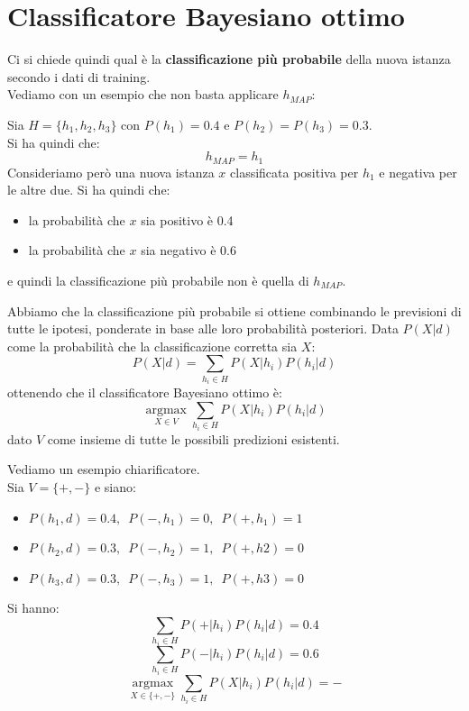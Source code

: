 \section{Classificatore Bayesiano ottimo}
Ci si chiede quindi qual è la \textbf{classificazione più probabile} della nuova istanza
secondo i dati di training.\\
Vediamo con un esempio che non basta applicare $h_{MAP}$:
\begin{esempio}
  Sia $H=\{h_1, h_2, h_3\}$ con $P(h_1)=0.4$ e $P(h_2)=P(h_3)=0.3$.\\
  Si ha quindi che:
  \[h_{MAP}=h_1\]
  Consideriamo però una nuova istanza $x$ classificata positiva per $h_1$ e
  negativa per le altre due. Si ha quindi che:
  \begin{itemize}
    \item la probabilità che $x$ sia positivo è 0.4
    \item la probabilità che $x$ sia negativo è 0.6
  \end{itemize}
  e quindi la classificazione più probabile non è quella di $h_{MAP}$.
\end{esempio}
Abbiamo che la classificazione più probabile si ottiene combinando le previsioni
di tutte le ipotesi, ponderate in base alle loro probabilità posteriori. Data
$P(X|d)$ come la probabilità che la classificazione corretta sia $X$:
\[P(X|d)=\sum_{h_i\in H}P(X|h_i)P(h_i|d)\]
ottenendo che il classificatore Bayesiano ottimo è:
\[\operatorname*{argmax}_{X\in V}\sum_{h_i\in H}P(X|h_i)P(h_i|d)\]
dato $V$ come insieme di tutte le possibili predizioni esistenti.
\begin{esempio}
  Vediamo un esempio chiarificatore.\\
  Sia $V=\{+,-\}$ e siano:
  \begin{itemize}
    \item $P(h_1, d) =0.4,\,\,\, P(-, h_1) = 0,\,\,\, P(+, h_1) = 1$
    \item $P(h_2, d) =0.3,\,\,\, P(-, h_2) = 1,\,\,\, P(+, h2) = 0$
    \item $P(h_3, d) =0.3,\,\,\, P(-, h_3) = 1,\,\,\, P(+, h3) = 0$
  \end{itemize}
  Si hanno:
  \[\sum_{h_i\in H}P(+|h_i)P(h_i|d)=0.4\]
  \[\sum_{h_i\in H}P(-|h_i)P(h_i|d)=0.6\]
  \[\operatorname*{argmax}_{X\in \{+,-\}}\sum_{h_i\in H}P(X|h_i)P(h_i|d)= - \]
\end{esempio}
